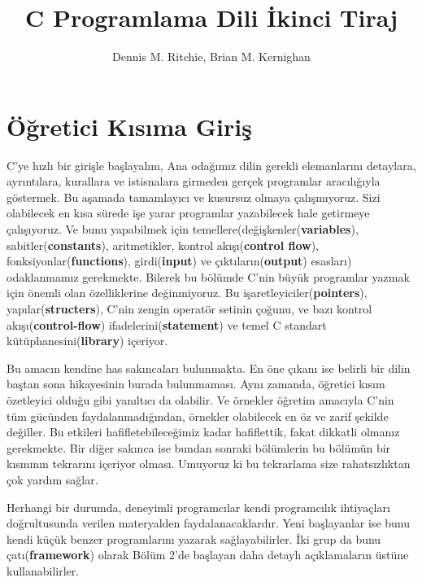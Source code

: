 \documentclass[a4paper,12pt,oneside]{book}
\begin{document}
\author{Dennis M. Ritchie, Brian M. Kernighan}
\title{C Programlama Dili İkinci Tiraj}
\date{}




\maketitle

\chapter{Öğretici Kısıma Giriş}
C'ye hızlı bir girişle başlayalım, Ana odağımız dilin gerekli elemanlarını detaylara, ayrıntılara, kurallara ve istisnalara girmeden gerçek programlar aracılığıyla göstermek. Bu aşamada tamamlayıcı ve kusursuz olmaya çalışmıyoruz. Sizi olabilecek en kısa sürede işe yarar programlar yazabilecek hale getirmeye çalışıyoruz. Ve bunu yapabilmek için temellere(değişkenler(\textbf{variables}), sabitler(\textbf{constants}), aritmetikler, kontrol akışı(\textbf{control flow}), fonksiyonlar(\textbf{functions}), girdi(\textbf{input}) ve çıktıların(\textbf{output}) esasları) odaklanmamız gerekmekte. Bilerek bu bölümde C'nin büyük programlar yazmak için önemli olan özelliklerine değinmiyoruz. Bu işaretleyiciler(\textbf{pointers}), yapılar(\textbf{structers}), C'nin zengin operatör setinin çoğunu, ve bazı kontrol akışı(\textbf{control-flow}) ifadelerini(\textbf{statement}) ve temel C standart kütüphanesini(\textbf{library}) içeriyor.
\par Bu amacın kendine has sakıncaları bulunmakta. En öne çıkanı ise belirli bir dilin baştan sona hikayesinin burada bulunmaması. Aynı zamanda, öğretici kısım özetleyici olduğu gibi yanıltıcı da olabilir. Ve örnekler öğretim amacıyla C'nin tüm gücünden faydalanmadığından, örnekler olabilecek en öz ve zarif şekilde değiller. Bu etkileri hafifletebileceğimiz kadar hafiflettik, fakat dikkatli olmanız gerekmekte. Bir diğer sakınca ise bundan sonraki bölümlerin bu bölümün bir kısmının tekrarını içeriyor olması. Umuyoruz ki bu tekrarlama size rahatsızlıktan çok yardım sağlar.
\par Herhangi bir durumda, deneyimli programcılar kendi programcılık ihtiyaçları doğrultusunda verilen materyalden faydalanacaklardır. Yeni başlayanlar ise bunu kendi küçük benzer programlarını yazarak sağlayabilirler. İki grup da bunu çatı(\textbf{framework}) olarak Bölüm 2'de başlayan daha detaylı açıklamaların üstüne kullanabilirler.
\end{document}
